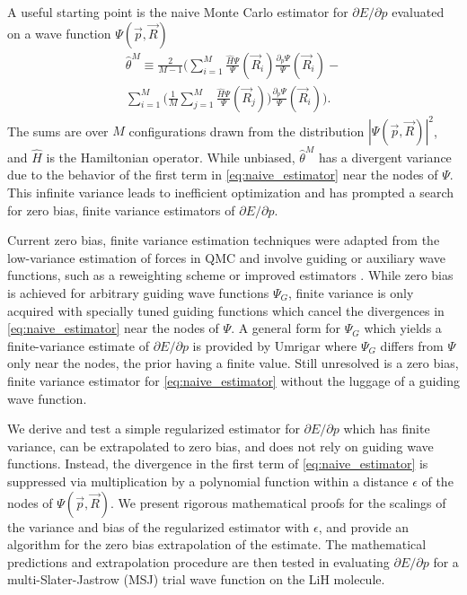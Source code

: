 \documentclass[twocolumn]{revtex4-1}
\begin{document}
A useful starting point is the naive Monte Carlo estimator for $\partial E/\partial p$ evaluated on a wave function $\Psi(\vec{p}, \vec{R})$ 
\begin{equation}
\begin{split}
\hat{\theta}^M \equiv \frac{2}{M-1}\Bigg(\sum_{i=1}^M \frac{\hat{H}\Psi}{\Psi}(\vec{R}_i) \frac{\partial_p \Psi}{\Psi}(\vec{R}_i)- \\ \sum_{i=1}^M \Big(\frac{1}{M} \sum_{j=1}^M \frac{\hat{H}\Psi}{\Psi}(\vec{R}_j)\Big)\frac{\partial_p \Psi}{\Psi}(\vec{R}_i) \Bigg). 
\end{split}
\label{eq:naive_estimator}
\end{equation}
The sums are over $M$ configurations drawn from the distribution $|\Psi(\vec{p}, \vec{R})|^2$, and $\hat{H}$ is the Hamiltonian operator.
While unbiased, $\hat{\theta}^M$ has a divergent variance \cite{Avella, doi:10.1063/1.4933112} due to the behavior of the first term in \eqref{eq:naive_estimator} near the nodes of $\Psi$.
This infinite variance leads to inefficient optimization and has prompted a search for zero bias, finite variance estimators of $\partial E/\partial p$.

Current zero bias, finite variance estimation techniques were adapted from the low-variance estimation of forces in QMC \cite{doi:10.1063/1.462059, doi:10.1063/1.3516208, Phys2016} and involve guiding or auxiliary wave functions, such as a reweighting scheme \cite{Avella, Attaccalite2008, Zen2013} or improved estimators \cite{Assaraf1999, doi:10.1063/1.1286598, Assaraf2003}.
While zero bias is achieved for arbitrary guiding wave functions $\Psi_G$, finite variance is only acquired with specially tuned guiding functions which cancel the divergences in \eqref{eq:naive_estimator} near the nodes of $\Psi$.
A general form for $\Psi_G$ which yields a finite-variance estimate of $\partial E/\partial p$ is provided by Umrigar \cite{doi:10.1063/1.4933112} where $\Psi_G$ differs from $\Psi$ only near the nodes, the prior having a finite value.
Still unresolved is a zero bias, finite variance estimator for \eqref{eq:naive_estimator} without the luggage of a guiding wave function. 

We derive and test a simple regularized estimator for $\partial E/\partial p$ which has finite variance, can be extrapolated to zero bias, and does not rely on guiding wave functions.
Instead, the divergence in the first term of \eqref{eq:naive_estimator} is suppressed via multiplication by a polynomial function within a distance $\epsilon$ of the nodes of $\Psi(\vec{p}, \vec{R})$. 
We present rigorous mathematical proofs for the scalings of the variance and bias of the regularized estimator with $\epsilon$, and provide an algorithm for the zero bias extrapolation of the estimate.
The mathematical predictions and extrapolation procedure are then tested in evaluating $\partial E/\partial p$ for a multi-Slater-Jastrow (MSJ) trial wave function on the LiH molecule.
\end{document}
